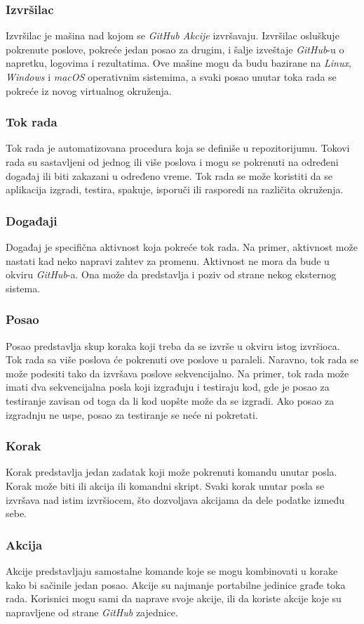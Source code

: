 \subsubsection{Izvršilac}
Izvršilac je mašina nad kojom se \textit{GitHub Akcije} izvršavaju. Izvršilac osluškuje pokrenute poslove,
pokreće jedan posao za drugim, i šalje izveštaje \textit{GitHub}-u o napretku, logovima i rezultatima. Ove 
mašine mogu da budu bazirane na \textit{Linux}, \textit{Windows} i \textit{macOS} operativnim sistemima, a svaki posao 
unutar toka rada se pokreće iz novog virtualnog okruženja.~\cite{GitHubActions}

\subsubsection{Tok rada}
Tok rada je automatizovana procedura koja se definiše u repozitorijumu. Tokovi rada su sastavljeni 
od jednog ili više poslova i mogu se pokrenuti na određeni događaj ili biti zakazani u određeno vreme. 
Tok rada se može koristiti da se aplikacija izgradi, testira, spakuje, isporuči ili rasporedi na 
različita okruženja.

\subsubsection{Događaji}
Događaj je specifična aktivnost koja pokreće tok rada. Na primer, aktivnost može nastati kad neko napravi 
zahtev za promenu. Aktivnost ne mora da bude u okviru \textit{GitHub}-a. Ona može da predstavlja i poziv od strane 
nekog eksternog sistema.

\subsubsection{Posao}
Posao predstavlja skup koraka koji treba da se izvrše u okviru istog izvršioca. Tok rada sa više poslova 
će pokrenuti ove poslove u paraleli. Naravno, tok rada se može podesiti tako da izvršava poslove 
sekvencijalno. Na primer, tok rada može imati dva sekvencijalna posla koji izgrađuju i testiraju kod, 
gde je posao za testiranje zavisan od toga da li kod uopšte može da se izgradi. Ako posao za izgradnju 
ne uspe, posao za testiranje se neće ni pokretati.

\subsubsection{Korak}
Korak predstavlja jedan zadatak koji može pokrenuti komandu unutar posla. Korak može biti ili akcija ili 
komandni skript. Svaki korak unutar posla se izvršava nad istim izvršiocem, što dozvoljava akcijama da 
dele podatke između sebe.

\subsubsection{Akcija}
Akcije predstavljaju samostalne komande koje se mogu kombinovati u korake kako bi sačinile jedan posao.
Akcije su najmanje portabilne jedinice građe toka rada. Korisnici mogu sami da naprave svoje akcije,
ili da koriste akcije koje su napravljene od strane \textit{GitHub} zajednice. 
